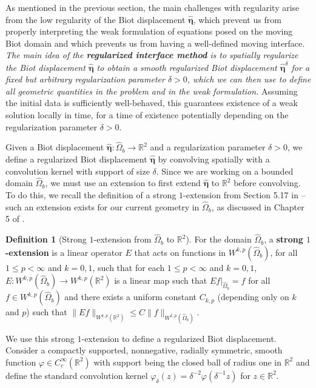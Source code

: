 \documentclass[11pt]{article}
\newcommand{\bd}{\boldsymbol}
\def\R{{\mathbb R}}
\theoremstyle{definition}
\newtheorem{definition}{Definition}[section]
\begin{document}
As mentioned in the previous section, the main challenges with regularity arise from the low regularity of the Biot displacement $\hat{\bd{\eta}}$, which prevent us from properly interpreting the weak formulation of equations posed on the moving Biot domain and which prevents us from having a well-defined moving interface. \textit{The main idea of the \textbf{regularized interface method} is to spatially regularize the Biot displacement $\hat{\bd{\eta}}$ to obtain a smooth regularized Biot displacement $\hat{\bd{\eta}}^{\delta}$ for a fixed but arbitrary regularization parameter $\delta > 0$, which we can then use to define all geometric quantities in the problem and in the weak formulation.} Assuming the initial data is sufficiently well-behaved, this guarantees existence of a weak solution locally in time, for a time of existence potentially depending on the regularization parameter $\delta > 0$.

Given a Biot displacement $\hat{\bd{\eta}}: \hat{\Omega}_{b} \to \R^{2}$ and a regularization parameter $\delta > 0$, we define a regularized Biot displacement $\hat{\bd{\eta}}$ by convolving spatially with a convolution kernel with support of size $\delta$. Since we are working on a bounded domain $\hat{\Omega}_{b}$, we must use an extension to first extend $\hat{\bd{\eta}}$ to $\R^{2}$ before convolving. To do this, we recall the definition of a strong $1$-extension from Section 5.17 in \cite{Adams} --  such an extension exists for our current geometry in $\hat{\Omega}_{b}$, as discussed in Chapter 5 of \cite{Adams}.

\begin{definition}[Strong $1$-extension from $\hat{\Omega}_{b}$ to $\R^{2}$]\label{extension}
For the domain $\hat{\Omega}_{b}$, a \textbf{strong $1$-extension} is a linear operator $E$ that acts on functions in $W^{k, p}(\hat{\Omega}_{b})$, for all $1 \le p < \infty$ and $k = 0, 1$, such that for each $1 \le p < \infty$ and $k = 0, 1$, $E: W^{k, p}(\hat{\Omega}_{b}) \to W^{k, p}(\R^{2})$ is a linear map such that $Ef|_{\hat{\Omega}_{b}} = f$ for all $f \in W^{k, p}(\hat{\Omega}_{b})$ and there exists a uniform constant $C_{k, p}$ (depending only on $k$ and $p$) such that $\|Ef\|_{W^{k, p}(\R^{2})} \le C\|f\|_{W^{k, p}(\hat{\Omega}_{b})}$. 
\end{definition}

We use this strong $1$-extension to define a regularized Biot displacement. Consider a compactly supported, nonnegative, radially symmetric, smooth function $\varphi \in C_{c}^{\infty}(\R^{2})$ with support being the closed ball of radius one in $\R^{2}$ and define the standard convolution kernel $\varphi_{\delta}(z) = \delta^{-2}\varphi(\delta^{-1}z)$ for $z \in \R^{2}$.
\end{document}
